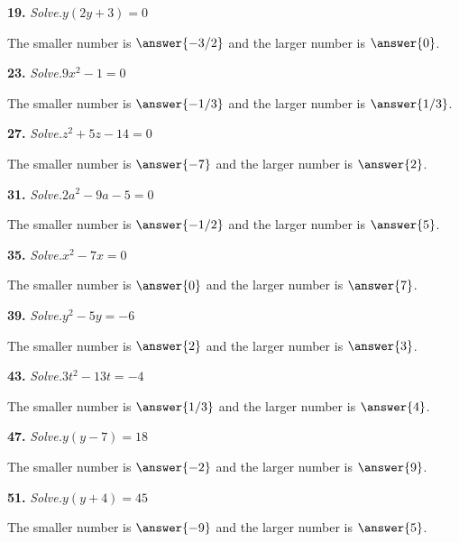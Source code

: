 \documentclass{ximera}
\begin{document}
\begin{problem}
\textbf{19.} \emph{Solve.}\quad $y(2y + 3) = 0$

The smaller number is $\answer{-3/2}$ and the larger number is $\answer{0}$.
\end{problem}

\begin{problem}
\textbf{23.} \emph{Solve.}\quad $9x^2 - 1 = 0$

The smaller number is $\answer{-1/3}$ and the larger number is $\answer{1/3}$.
\end{problem}

\begin{problem}
\textbf{27.} \emph{Solve.}\quad $z^2 + 5z - 14 = 0$

The smaller number is $\answer{-7}$ and the larger number is $\answer{2}$.
\end{problem}

\begin{problem}
\textbf{31.} \emph{Solve.}\quad $2a^2 - 9a - 5 = 0$

The smaller number is $\answer{-1/2}$ and the larger number is $\answer{5}$.
\end{problem}

\begin{problem}
\textbf{35.} \emph{Solve.}\quad $x^2 - 7x = 0$

The smaller number is $\answer{0}$ and the larger number is $\answer{7}$.
\end{problem}

\begin{problem}
\textbf{39.} \emph{Solve.}\quad $y^2 - 5y = -6$

The smaller number is $\answer{2}$ and the larger number is $\answer{3}$.
\end{problem}

\begin{problem}
\textbf{43.} \emph{Solve.}\quad $3t^2 - 13t = -4$

The smaller number is $\answer{1/3}$ and the larger number is $\answer{4}$.
\end{problem}

\begin{problem}
\textbf{47.} \emph{Solve.}\quad $y(y - 7) = 18$

The smaller number is $\answer{-2}$ and the larger number is $\answer{9}$.
\end{problem}

\begin{problem}
\textbf{51.} \emph{Solve.}\quad $y(y + 4) = 45$

The smaller number is $\answer{-9}$ and the larger number is $\answer{5}$.
\end{problem}
\end{document}
